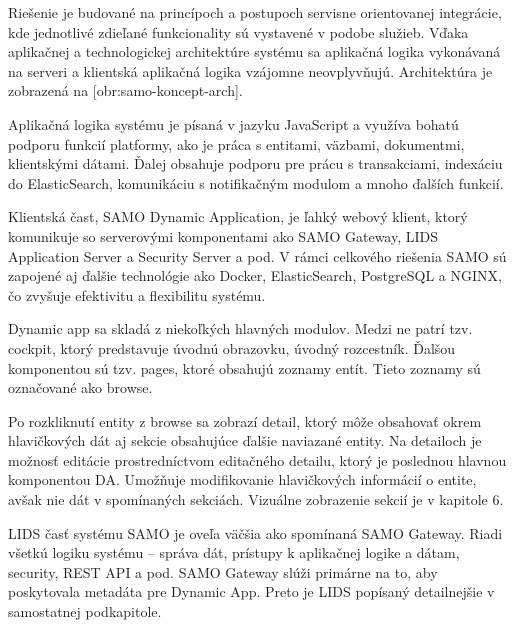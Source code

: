 Riešenie je budované na princípoch a postupoch servisne orientovanej integrácie, kde jednotlivé zdieľané funkcionality sú vystavené v podobe služieb. Vďaka aplikačnej a technologickej architektúre systému sa aplikačná logika vykonávaná na serveri a klientská aplikačná logika vzájomne neovplyvňujú. Architektúra je zobrazená na [obr:samo-koncept-arch].

Aplikačná logika systému je písaná v jazyku JavaScript a využíva bohatú podporu funkcií platformy, ako je práca s entitami, väzbami, dokumentmi, klientskými dátami. Ďalej obsahuje podporu pre prácu s transakciami, indexáciu do ElasticSearch, komunikáciu s notifikačným modulom a mnoho ďalších funkcií.





Klientská čast, SAMO Dynamic Application, je ľahký webový klient, ktorý komunikuje so serverovými komponentami ako SAMO Gateway, LIDS Application Server a Security Server a pod. V rámci celkového riešenia SAMO sú zapojené aj ďalšie technológie ako Docker, ElasticSearch, PostgreSQL a NGINX, čo zvyšuje efektivitu a flexibilitu systému.

Dynamic app sa skladá z niekoľkých hlavných modulov. Medzi ne patrí tzv. cockpit, ktorý predstavuje úvodnú obrazovku, úvodný rozcestník. Ďalšou komponentou sú tzv. pages, ktoré obsahujú zoznamy entít. Tieto zoznamy sú označované ako browse. 

Po rozkliknutí entity z browse sa zobrazí detail, ktorý môže obsahovať okrem hlavičkových dát aj sekcie obsahujúce ďalšie naviazané entity. Na detailoch je možnosť editácie prostredníctvom editačného detailu,  ktorý je poslednou hlavnou komponentou DA. Umožňuje modifikovanie hlavičkových informácií o entite, avšak nie dát v spomínaných sekciách. Vizuálne zobrazenie sekcií je v kapitole 6.



LIDS časť systému SAMO je oveľa väčšia ako spomínaná SAMO Gateway. Riadi všetkú logiku systému -- správa dát, prístupy k aplikačnej logike a dátam, security, REST API a pod. SAMO Gateway slúži primárne na to, aby poskytovala metadáta pre Dynamic App. Preto je LIDS popísaný detailnejšie v samostatnej podkapitole.

